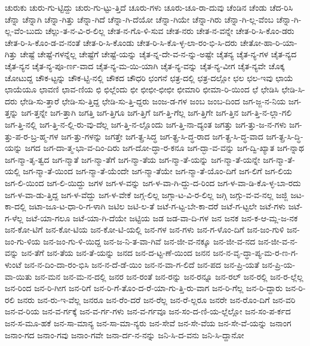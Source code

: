 {ಚುರುಕು
ಚುರು-ಗು-ಟ್ಟಿದ್ದು
ಚುರು-ಗು-ಟ್ಟು-ತ್ತಿದೆ
ಚೂರು-ಗಳು
ಚೂರು-ಚೂ-ರಾ-ದುವು
ಚೆಂಡಿನ
ಚೆಂಡು
ಚೆದ-ರಿಸಿ
ಚೆನ್ನಾ
ಚೆನ್ನಾಗಿ
ಚೆನ್ನಾ-ಗಿತ್ತು
ಚೆನ್ನಾ-ಗಿದೆ
ಚೆನ್ನಾ-ಗಿ-ದೆಯೋ
ಚೆನ್ನಾ-ಗಿಯೇ
ಚೆನ್ನಾ-ಗಿರು
ಚೆನ್ನಾ-ಗಿ-ಲ್ಲ-ವೆಂಬ
ಚೆನ್ನಾ-ಗಿ-ಲ್ಲ-ವೆಂ-ಬುದು
ಚೆಲ್ಲು-ತ-ನ-ವಿ-ರ-ಲಿಲ್ಲ
ಚೇತ-ನ-ಗೊ-ಳಿ-ಸುವ
ಚೇತ-ನರು
ಚೇತ-ನ-ವನ್ನೇ
ಚೇತ-ರಿ-ಸಿ-ಕೊಂ-ಡರು
ಚೇತ-ರಿ-ಸಿ-ಕೊಂ-ಡ-ವ-ನಂತೆ
ಚೇತ-ರಿ-ಸಿ-ಕೊಂಡು
ಚೇತ-ರಿ-ಸಿ-ಕೊ-ಳ್ಳ-ಲಾ-ರಂ-ಭಿ-ಸಿ-ದರು
ಚೇತೋ-ಹಾ-ರಿ-ಯಾ-ಗಿತ್ತು
ಚೇಷ್ಟೆ
ಚೇಷ್ಟೆ-ಗಳನ್ನೆಲ್ಲ
ಚೇಷ್ಟೆಗೆ
ಚೇಷ್ಟೆ-ಯನ್ನು
ಚೈತ-ನ್ನ-ದೇ-ವ-ನ-ನ್ನು-ಅಷ್ಟೇ
ಚೈತನ್ಯ
ಚೈತ-ನ್ಯ-ಗಳ
ಚೈತ-ನ್ಯದ
ಚೈತ-ನ್ಯನ
ಚೈತ-ನ್ಯ-ಪೂ-ರ್ಣ-ವಾದ
ಚೈತ-ನ್ಯ-ಮ-ಯಿ-ಯಾಗಿ
ಚೈತ-ನ್ಯ-ವನ್ನು
ಚೈತ-ನ್ಯ-ವೀಗ
ಚೈತ-ನ್ಯವೇ
ಚೊಕ್ಕ
ಚೋಟುದ್ದ
ಚೌಕ-ಟ್ಟನ್ನು
ಚೌಕ-ಟ್ಟಿ-ನಲ್ಲಿ
ಚೌಕದ
ಚೌಧರಿ
ಛಂಗನೆ
ಛತ್ರ-ದಲ್ಲಿ
ಛತ್ರ-ದಲ್ಲೋ
ಛಲ
ಛಲ-ಇವು
ಛಾಯೆ
ಛಾಯೆಯೂ
ಛಾವಣಿ
ಛಾವ-ಣಿಯ
ಛಿ
ಛಿಲ್ಲೆಂದು
ಛೀ
ಛೀಛೀ-ಛೀಛೀ
ಛೀಮಾರಿ
ಛೀಮಾ-ರಿ-ಯಿಂದ
ಛೆ
ಛೇಡಿಸಿ
ಛೇಡಿ-ಸಿ-ದರು
ಛೇಡಿ-ಸು-ತ್ತಾರೆ
ಛೇಡಿ-ಸು-ತ್ತಿದ್ದ
ಛೇಡಿ-ಸು-ತ್ತಿ-ದ್ದರು
ಜಂಜ-ಡ-ಗಳ
ಜಂಬ
ಜಂಬ-ದಿಂದ
ಜಗ-ಜ್ಜ-ನ-ನಿಯ
ಜಗ-ತ್ತನ್ನು
ಜಗ-ತ್ತನ್ನೇ
ಜಗ-ತ್ತಾಗಿ
ಜಗತ್ತಿ
ಜಗ-ತ್ತಿಗೂ
ಜಗ-ತ್ತಿಗೆ
ಜಗ-ತ್ತಿ-ಗೆಲ್ಲ
ಜಗ-ತ್ತಿಗೇ
ಜಗ-ತ್ತಿನ
ಜಗ-ತ್ತಿ-ನ-ಲ್ಲಾ-ಗಲಿ
ಜಗ-ತ್ತಿ-ನಲ್ಲಿ
ಜಗ-ತ್ತಿ-ನ-ಲ್ಲಿ-ರು-ವು-ದೆಲ್ಲ
ಜಗ-ತ್ತಿ-ನ-ಲ್ಲೊಂದು
ಜಗ-ತ್ತಿ-ನಾ-ದ್ಯಂತ
ಜಗತ್ತು
ಜಗ-ತ್ತು-ಜ-ನ-ಗಳು
ಜಗ-ತ್ತು-ಪ-ರ-ಬ್ರ-ಹ್ಮ-ಗಳ
ಜಗ-ತ್ತು-ಗಳನ್ನು
ಜಗತ್ತೇ
ಜಗ-ತ್ಪ್ರ-ಸಿದ್ಧ
ಜಗ-ತ್ಪ್ರ-ಸಿ-ದ್ಧ-ರಾದ
ಜಗ-ತ್ಪ್ರ-ಸಿ-ದ್ಧ-ವಾದ
ಜಗ-ತ್ಪ್ರ-ಸಿ-ದ್ಧಿ-ಯನ್ನು
ಜಗದ
ಜಗ-ದಾ-ತ್ಮ-ಭಾ-ವ-ದಿಂ-ದಿರು
ಜಗ-ದೋ-ದ್ಧಾ-ರ-ಕನೂ
ಜಗ-ದ್ಭಾ-ವ-ವನ್ನು
ಜಗ-ದ್ವಿ-ಖ್ಯಾತ
ಜಗ-ನ್ನಾಥ
ಜಗ-ನ್ಮಾ-ತೃ-ತ್ವದ
ಜಗ-ನ್ಮಾತೆ
ಜಗ-ನ್ಮಾ-ತೆಗೆ
ಜಗ-ನ್ಮಾ-ತೆಯ
ಜಗ-ನ್ಮಾ-ತೆ-ಯನ್ನು
ಜಗ-ನ್ಮಾ-ತೆ-ಯನ್ನೇ
ಜಗ-ನ್ಮಾ-ತೆ-ಯಲ್ಲಿ
ಜಗ-ನ್ಮಾ-ತೆ-ಯಿಂದ
ಜಗ-ನ್ಮಾ-ತೆ-ಯೆಂದೇ
ಜಗ-ನ್ಮಾ-ತೆಯೇ
ಜಗ-ನ್ಮಾ-ತೆ-ಯೊಂ-ದಿಗೆ
ಜಗ-ಲಿಗೆ
ಜಗ-ಲಿಯ
ಜಗ-ಲಿ-ಯಿಂದ
ಜಗ-ಲಿ-ಯಿದ್ದು
ಜಗಳ
ಜಗ-ಳ-ವನ್ನು
ಜಗ-ಳ-ವಾ-ಗಿ-ದ್ದು-ದ-ರಿಂದ
ಜಗ-ಳ-ವಾ-ಡಿ-ಕೊ-ಳ್ಳ-ಬಾ-ರದು
ಜಗ-ಳ-ವಾ-ಡು-ತ್ತಿದ್ದ
ಜಗ-ಳ-ವೆದ್ದು
ಜಗ-ಳ-ವೇಕೆ
ಜಗ್ಗ-ಲಿಲ್ಲ
ಜಗ್ಗಾ-ಟ-ವಿ-ರ-ಲಿಲ್ಲ
ಜಗ್ಗಿ
ಜಗ್ಗು-ವ-ವ-ನಲ್ಲ
ಜಜ್ಜಿ
ಜಟ-ಕಾ-ದಲ್ಲಿ
ಜಟಾ-ಜೂ-ಟ-ಧಾ-ರಿ-ಗ-ಳಾಗಿ
ಜಟಿಲ
ಜಟಿ-ಲ-ತೆ
ಜಟೆ-ಗ-ಟ್ಟ-ಬೇ-ಕಾ-ದರೆ
ಜಟೆ-ಗ-ಟ್ಟಲೇ
ಜಟೆ-ಗಳು
ಜಟೆ-ಗ-ಳೆಲ್ಲ
ಜಟೆ-ಯಾ-ಗಲೂ
ಜಟೆ-ಯಾ-ಗಿ-ದೆಯೇ
ಜಟ್ಟಿಯ
ಜಡ
ಜಡ-ವಾ-ದಿ-ಗಳ
ಜನ
ಜನಕ
ಜನ-ಕ-ಆ-ಮ್ಲ-ಜ-ನಕ
ಜನ-ಕೋ-ಟಿಗೆ
ಜನ-ಕೋ-ಟಿಯ
ಜನ-ಕೋ-ಟಿ-ಯಲ್ಲಿ
ಜನ-ಗಳ
ಜನ-ಗಳು
ಜನ-ಗ-ಳೊಂ-ದಿಗೆ
ಜನ-ಜಂ-ಗುಳಿ
ಜನ-ಜಂ-ಗು-ಳಿಯ
ಜನ-ಜಂ-ಗು-ಳಿ-ಯಿದ್ದ
ಜನ-ಜ-ನಿ-ತ-ವಾ-ಗಿವೆ
ಜನ-ಜೀ-ವ-ನಕ್ಕೂ
ಜನ-ಜೀ-ವ-ನದ
ಜನ-ಜೀ-ವ-ನ-ವನ್ನು
ಜನ-ತೆಗೆ
ಜನ-ತೆಯ
ಜನ-ತೆ-ಯನ್ನು
ಜನದ
ಜನ-ದ-ಟ್ಟ-ಣೆ-ಯಿಂದ
ಜನನ
ಜನ-ನ-ವೃ-ದ್ಧಾ-ಪ್ಯ-ಮ-ರ-ಣ-ಗ-ಳುಂಟೆ
ಜನ-ನ-ದಿಂ-ದಾ-ರಂ-ಭಿಸಿ
ಜನ-ನ-ದೆ-ಡೆ-ಯಿಂ
ಜನ-ನ-ವಾ-ಗ-ಲಿದೆ
ಜನ-ಪದ
ಜನ-ಪ್ರಿ-ಯತೆ
ಜನ-ಪ್ರಿ-ಯ-ವಾ-ಯಿತು
ಜನ-ಮನ
ಜನ-ಮ-ನ-ದಲ್ಲಿ
ಜನರ
ಜನ-ರಂತೆ
ಜನ-ರನ್ನು
ಜನ-ರನ್ನೂ
ಜನ-ರಲ್
ಜನ-ರಲ್ಲಿ
ಜನ-ರ-ಲ್ಲೆಲ್ಲ
ಜನ-ರಿಂದ
ಜನ-ರಿ-ಗೀಗ
ಜನ-ರಿಗೆ
ಜನ-ರಿ-ಗೆ-ತೊಂ-ದ-ರೆ-ಯಾ-ಗು-ತ್ತಿ-ರು-ವಾಗ
ಜನ-ರಿ-ಗೆಲ್ಲ
ಜನ-ರಿ-ದ್ದಾರು
ಜನ-ರಿ-ರಲಿ
ಜನರು
ಜನ-ರು-ಇ-ವೆಲ್ಲ
ಜನರೂ
ಜನ-ರೆಂ-ದರೆ
ಜನ-ರೆಲ್ಲ
ಜನ-ರೆ-ಲ್ಲರೂ
ಜನರೇ
ಜನ-ರೊಂ-ದಿಗೆ
ಜನ-ವರಿ
ಜನ-ವ-ರಿಯ
ಜನ-ವ-ರ್ಗಕ್ಕೆ
ಜನ-ವ-ರ್ಗ-ಗಳು
ಜನ-ವ-ರ್ಗವೂ
ಜನ-ಸಂ-ದ-ಣಿ-ಯ-ಲ್ಲೆಲ್ಲೋ
ಜನ-ಸಂ-ಪ-ರ್ಕದ
ಜನ-ಸ-ಮೂ-ಹಕೆ
ಜನ-ಸಾ-ಮಾನ್ಯ
ಜನ-ಸಾ-ಮಾ-ನ್ಯರು
ಜನ-ಸೇವೆ
ಜನ-ಸೇ-ವೆಯ
ಜನ-ಸೇ-ವೆ-ಯನ್ನು
ಜನಾಂಗ
ಜನಾಂ-ಗದ
ಜನಾಂ-ಗವು
ಜನಾಂ-ಗವೇ
ಜನಾ-ರ್ದ-ನ-ನನ್ನು
ಜನಿ-ಸಿ-ದ-ವನು
ಜನಿ-ಸಿ-ದ್ದಾನೋ
}
